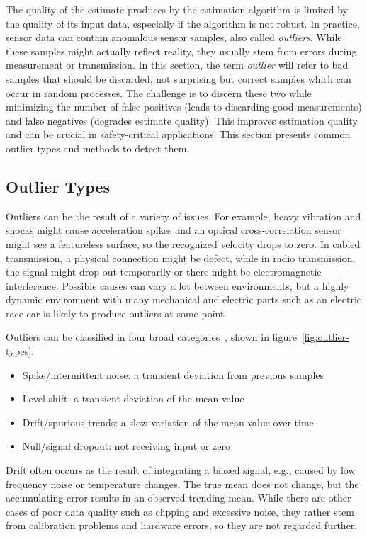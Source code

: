 The quality of the estimate produces by the estimation algorithm is limited by the quality of its input data, especially if the algorithm is not robust. In practice, sensor data can contain anomalous sensor samples, also called \textit{outliers}. While these samples might actually reflect reality, they usually stem from errors during measurement or transmission. In this section, the term \textit{outlier} will refer to bad samples that should be discarded, not surprising but correct samples which can occur in random processes. The challenge is to discern these two while minimizing the number of false positives (leads to discarding good measurements) and false negatives (degrades estimate quality). This improves estimation quality and can be crucial in safety-critical applications. This section presents common outlier types and methods to detect them.


\subsection{Outlier Types}\label{sec:outlier-types}
Outliers can be the result of a variety of issues. For example, heavy vibration and shocks might cause acceleration spikes and an optical cross-correlation sensor might see a featureless surface, so the recognized velocity drops to zero. In cabled transmission, a physical connection might be defect, while in radio transmission, the signal might drop out temporarily or there might be electromagnetic interference. Possible causes can vary a lot between environments, but a highly dynamic environment with many mechanical and electric parts such as an electric race car is likely to produce outliers at some point.

Outliers can be classified in four broad categories~\cites[p.~19]{Kabzan.2019}[p.~165~ff.]{Himmelblau.1994}, shown in figure~\ref{fig:outlier-types}:
\begin{itemize}
\item Spike/intermittent noise: a transient deviation from previous samples
\item Level shift: a transient deviation of the mean value
\item Drift/spurious trends: a slow variation of the mean value over time
\item Null/signal dropout: not receiving input or zero
\end{itemize}
Drift often occurs as the result of integrating a biased signal, e.g., caused by low frequency noise or temperature changes. The true mean does not change, but the accumulating error results in an observed trending mean. While there are other cases of poor data quality such as clipping and excessive noise, they rather stem from calibration problems and hardware errors, so they are not regarded further.


